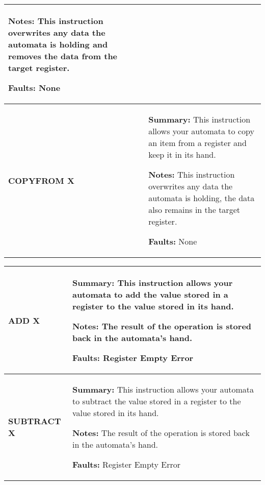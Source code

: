 \begin{center}
\begin{tabular}{ | m{3cm} | m{11cm} | }
    
            \textbf{Notes:} 
            \newline This instruction overwrites any data the automata is holding and removes the data from the target register.
    
            \textbf{Faults:}
            \newline None\\
        \hline
            \begin{center}
                \textbf{COPYFROM X} 
            \end{center}& 
            \textbf{Summary:} 
            \newline This instruction allows your automata to copy an item from a register and keep it in its hand.
    
            \textbf{Notes:} 
            \newline This instruction overwrites any data the automata is holding, the data also remains in the target register.
    
            \textbf{Faults:}
            \newline None\\
        \hline
    \end{tabular}

    \begin{tabular}{ | m{3cm} | m{11cm} | } 
        \hline
            \begin{center}
                \textbf{ADD X} 
            \end{center}& 
            \textbf{Summary:} 
            \newline This instruction allows your automata to add the value stored in a register to the value stored in its hand.
    
            \textbf{Notes:} 
            \newline The result of the operation is stored back in the automata’s hand.
    
            \textbf{Faults:}
            \newline Register Empty Error\\
        \hline
            \begin{center}
                \textbf{SUBTRACT X} 
            \end{center}& 
            \textbf{Summary:} 
            \newline This instruction allows your automata to subtract the value stored in a register to the value stored in its hand.

            \textbf{Notes:} 
            \newline The result of the operation is stored back in the automata’s hand.

            \textbf{Faults:}
            \newline Register Empty Error\\
        \hline
    \end{tabular}
\end{center}
\newpage